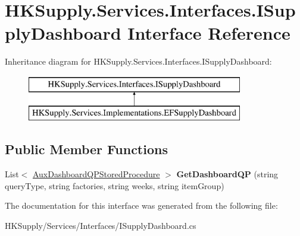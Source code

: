 \hypertarget{interface_h_k_supply_1_1_services_1_1_interfaces_1_1_i_supply_dashboard}{}\section{H\+K\+Supply.\+Services.\+Interfaces.\+I\+Supply\+Dashboard Interface Reference}
\label{interface_h_k_supply_1_1_services_1_1_interfaces_1_1_i_supply_dashboard}
Inheritance diagram for H\+K\+Supply.\+Services.\+Interfaces.\+I\+Supply\+Dashboard\+:\begin{figure}[H]
\begin{center}
\leavevmode
\includegraphics[height=2.000000cm]{interface_h_k_supply_1_1_services_1_1_interfaces_1_1_i_supply_dashboard}
\end{center}
\end{figure}
\subsection*{Public Member Functions}
\begin{DoxyCompactItemize}
\item 
\mbox{\label{interface_h_k_supply_1_1_services_1_1_interfaces_1_1_i_supply_dashboard_ab1f89fa3557f732b5bfd46584777e553}} 
List$<$ \mbox{\hyperlink{class_h_k_supply_1_1_forms_1_1_supply_1_1_dashboard_1_1_aux_dashboard_q_p_stored_procedure}{Aux\+Dashboard\+Q\+P\+Stored\+Procedure}} $>$ {\bfseries Get\+Dashboard\+QP} (string query\+Type, string factories, string weeks, string item\+Group)
\end{DoxyCompactItemize}


The documentation for this interface was generated from the following file\+:\begin{DoxyCompactItemize}
\item 
H\+K\+Supply/\+Services/\+Interfaces/I\+Supply\+Dashboard.\+cs\end{DoxyCompactItemize}
